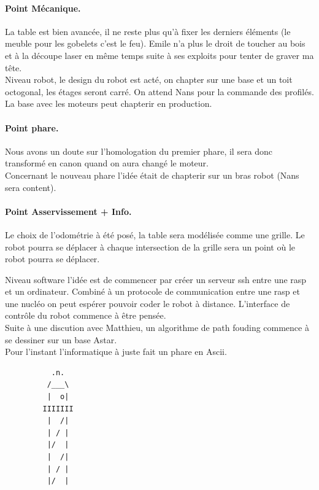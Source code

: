 \documentclass[a4paper,10pt]{report}
\theoremstyle{definition}
\begin{document}
\begin{spacing}{1.5}
\paragraph*{Point Mécanique.}
La table est bien avancée, il ne reste plus qu'à fixer les derniers éléments (le
meuble pour les gobelets c'est le feu). Emile n'a plus le droit de toucher au
bois et à la découpe laser en même temps suite à ses exploits pour tenter de
graver ma tête. \\
Niveau robot, le design du robot est acté, on chapter sur une base et un toit
octogonal, les étages seront carré. On attend Nans pour la commande des
profilés. La base avec les moteurs peut chapterir en production.

\paragraph*{Point phare.}
\label{sec:phare}
Nous avons un doute sur l'homologation du premier phare, il sera donc transformé
en canon quand on aura changé le moteur. \\
Concernant le nouveau phare l'idée était de chapterir sur un bras robot (Nans sera
content).

\paragraph*{Point Asservissement + Info.}
Le choix de l'odométrie à été posé, la table sera modélisée comme une grille. Le
robot pourra se déplacer à chaque intersection de la grille sera un point où le
robot pourra se déplacer.\\
\begin{center}
\end{center}
Niveau software l'idée est de commencer par créer un serveur ssh entre une rasp
et un ordinateur. Combiné à un protocole de communication entre une rasp et une
nucléo on peut espérer pouvoir coder le robot à distance. L'interface de
contrôle du robot commence à être pensée. \\
Suite à une discution avec Matthieu, un algorithme de path fouding commence à se
dessiner sur un base Astar.\\ Pour l'instant l'informatique à juste fait un
phare en Ascii.
\newpage
\begin{figure}[!h]
  \center
  \begin{lstlisting}
     .n.
    /___\
    |  o|
   IIIIIII
    |  /|
    | / |
    |/  |
    |  /|
    | / |
    |/  |
  \end{lstlisting}
\end{figure}

\end{spacing}
\end{document}
